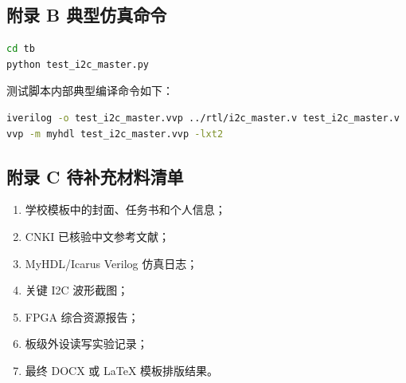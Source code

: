 \documentclass[12pt,a4paper]{article}
\numberwithin{equation}{section}
\providecommand{\tightlist}{%
  \setlength{\itemsep}{0pt}\setlength{\parskip}{0pt}}
\begin{document}
\subsection{附录 B
典型仿真命令}\label{ux9644ux5f55-b-ux5178ux578bux4effux771fux547dux4ee4}

\begin{lstlisting}[language=bash]
cd tb
python test_i2c_master.py
\end{lstlisting}

测试脚本内部典型编译命令如下：

\begin{lstlisting}[language=bash]
iverilog -o test_i2c_master.vvp ../rtl/i2c_master.v test_i2c_master.v
vvp -m myhdl test_i2c_master.vvp -lxt2
\end{lstlisting}

\subsection{附录 C
待补充材料清单}\label{ux9644ux5f55-c-ux5f85ux8865ux5145ux6750ux6599ux6e05ux5355}

\begin{enumerate}
\def\labelenumi{\arabic{enumi}.}
\tightlist
\item
  学校模板中的封面、任务书和个人信息；
\item
  CNKI 已核验中文参考文献；
\item
  MyHDL/Icarus Verilog 仿真日志；
\item
  关键 I2C 波形截图；
\item
  FPGA 综合资源报告；
\item
  板级外设读写实验记录；
\item
  最终 DOCX 或 LaTeX 模板排版结果。
\end{enumerate}
\end{document}

